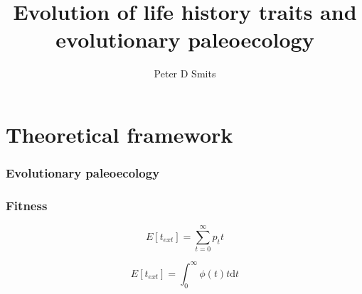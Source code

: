 \documentclass{beamer}
\title{Evolution of life history traits and evolutionary paleoecology}
\author{Peter D Smits}
\institute{Committee on Evolutionary Biology, University of Chicago}
\begin{document}
\begin{frame}
  \maketitle
\end{frame}

\section{Theoretical framework}
\begin{frame}
  \frametitle{Evolutionary paleoecology}
\end{frame}

\begin{frame}
  \frametitle{Fitness}

  \begin{equation}
    E[t_{ext}] = \sum_{t = 0}^{\infty} p_{t} t
  \end{equation}

  \begin{equation}
    E[t_{ext}] = \int_{0}^{\infty} \phi(t) t \mathrm{d}t
  \end{equation}

\end{frame}
%
%
%
\end{document}
